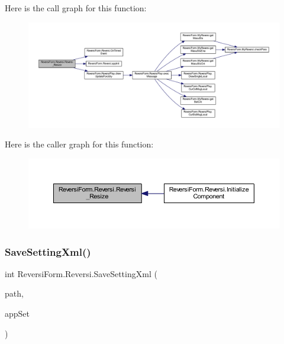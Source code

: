 Here is the call graph for this function\+:
\nopagebreak
\begin{figure}[H]
\begin{center}
\leavevmode
\includegraphics[width=350pt]{class_reversi_form_1_1_reversi_ac4868f12e6f15387f8f39f5f1934e610_cgraph}
\end{center}
\end{figure}
Here is the caller graph for this function\+:
\nopagebreak
\begin{figure}[H]
\begin{center}
\leavevmode
\includegraphics[width=350pt]{class_reversi_form_1_1_reversi_ac4868f12e6f15387f8f39f5f1934e610_icgraph}
\end{center}
\end{figure}
\mbox{\label{class_reversi_form_1_1_reversi_ac2c2df740914f062761a66f0bbde3f41}} 
\subsubsection{\texorpdfstring{Save\+Setting\+Xml()}{SaveSettingXml()}}
{\footnotesize\ttfamily int Reversi\+Form.\+Reversi.\+Save\+Setting\+Xml (\begin{DoxyParamCaption}\item[{string}]{path,  }\item[{ref \hyperlink{class_reversi_form_1_1_reversi_setting}{Reversi\+Setting}}]{app\+Set }\end{DoxyParamCaption})}



